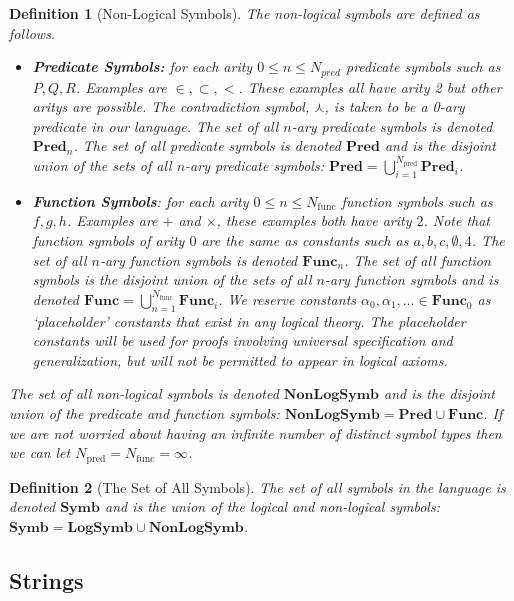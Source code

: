 \documentclass[12pt]{article}
\theoremstyle{break}
\newtheorem{definition}{Definition}[section]
\theoremstyle{break}
\theoremstyle{break}
\theoremstyle{break}
\theoremstyle{break}
\newtheorem{informal definition}[definition]{Informal Definition}
\begin{document}
\begin{definition}[Non-Logical Symbols]
The non-logical symbols are defined as follows.
\begin{itemize}
\item{\textbf{Predicate Symbols:} for each arity $0 \le n \le N_{pred}$ predicate symbols such as $P, Q, R$. Examples are $\in, \subset, <$. These examples all have arity 2 but other aritys are possible. The contradiction symbol, $\curlywedge$, is taken to be a 0-ary predicate in our language. The set of all $n$-ary predicate symbols is denoted $\textbf{Pred}_n$. The set of all predicate symbols is denoted $\textbf{Pred}$ and is the disjoint union of the sets of all $n$-ary predicate symbols: $\textbf{Pred} = \bigcup_{i=1}^{N_{\text{pred}}} \textbf{Pred}_i$.}
\item{\textbf{Function Symbols}: for each arity $0 \le n \le N_{\text{func}}$ function symbols such as $f, g, h$. Examples are $+$ and $\times$, these examples both have arity $2$. Note that function symbols of arity $0$ are the same as constants such as $a,b,c,\emptyset,4$. The set of all $n$-ary function symbols is denoted $\textbf{Func}_n$. The set of all function symbols is the disjoint union of the sets of all $n$-ary function symbols and is denoted $\textbf{Func} = \bigcup_{n=1}^{N_{\text{func}}} \textbf{Func}_i$. We reserve constants $\alpha_0, \alpha_1, \ldots \in \textbf{Func}_0$ as `placeholder' constants that exist in any logical theory. The placeholder constants will be used for proofs involving universal specification and generalization, but will not be permitted to appear in logical axioms.}
\end{itemize}

The set of all non-logical symbols is denoted $\textbf{NonLogSymb}$ and is the disjoint union of the predicate and function symbols: $\textbf{NonLogSymb} = \textbf{Pred} \cup \textbf{Func}$. If we are not worried about having an infinite number of distinct symbol types then we can let $N_{\text{pred}} = N_{\text{func}} = \infty$.
\end{definition}

\begin{definition}[The Set of All Symbols]
The set of all symbols in the language is denoted $\textbf{Symb}$ and is the union of the logical and non-logical symbols: $\textbf{Symb} = \textbf{LogSymb} \cup \textbf{NonLogSymb}$.
\end{definition}

\subsection{Strings}
\end{document}
